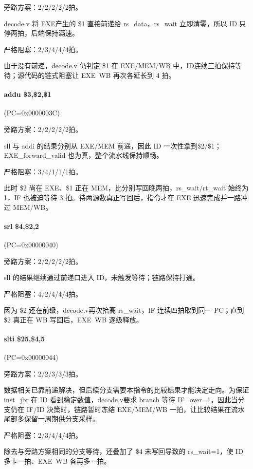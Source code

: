 \documentclass[a4paper]{article}
\begin{document}
	旁路方案：2/2/2/2/2拍。
	
	decode.v 将 EXE产生的 \$1 直接前递给 rs\_data，rs\_wait 立即清零，所以 ID 只停两拍，后端保持满速。
	
	严格阻塞：2/3/4/4/4拍。
	
	由于没有前递，decode.v 仍判定 \$1 在 EXE/MEM/WB 中，ID连续三拍保持等待；源代码的链式阻塞让 EXE~WB 再次各延长到 4 拍。
	
	\paragraph{addu \$3,\$2,\$1} (PC=0x0000003C)
	
	旁路方案：2/2/2/2/2拍。
	
	sll 与 addi 的结果分别从 EXE/MEM 前递，因此 ID 一次性拿到\$2/\$1；EXE\_forward\_valid 也为真，整个流水线保持顺畅。
	
	严格阻塞：3/4/1/1/1拍。
	
	此时 \$2 尚在 EXE、\$1 正在 MEM，比分别写回晚两拍，rs\_wait/rt\_wait 始终为 1，IF 也被迫等待 3 拍。待两源数真正写回后，指令才在 EXE 迅速完成并一路冲过 MEM/WB。
	
	\paragraph{srl \$4,\$2,2} (PC=0x00000040)
	
	旁路方案：2/2/2/2/2拍。
	
	sll 的结果继续通过前递口进入 ID，未触发等待；链路保持打通。
	
	严格阻塞：4/2/4/4/4拍。
	
	因为 \$2 还在前级，decode.v再次抬高 rs\_wait，IF 连续四拍取到同一 PC；直到 \$2 真正在 WB 写回后，EXE~WB 逐级释放。
	
	\paragraph{slti \$25,\$4,5} (PC=0x00000044)
	
	旁路方案：2/2/3/3/3拍。
	
	数据相关已靠前递解决，但后续分支需要本指令的比较结果才能决定走向。为保证 inst\_jbr 在 ID 看到稳定数值，decode.v要求 branch 等待 IF\_over=1，因此当分支仍在 IF/ID 决策时，链路暂时冻结 EXE/MEM/WB 一拍，让比较结果在流水尾部多保留一周期供分支采样。
	
	严格阻塞：2/3/4/4/4拍。
	
	除去与旁路方案相同的分支等待，还叠加了 \$4 未写回导致的 rs\_wait=1，使 ID 多卡一拍、EXE~WB 各再多一拍。
	
\end{document}

